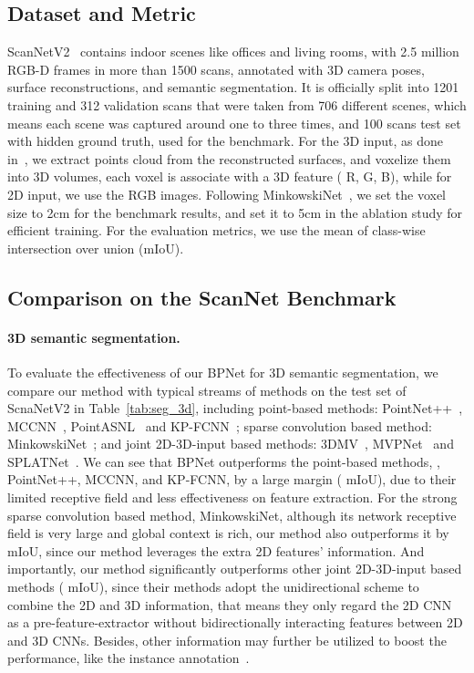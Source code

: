 \documentclass[final]{cvpr}
\begin{document}
	
\subsection{Dataset and Metric}
\vspace{-2mm}
ScanNetV2~\cite{dai2017scannet} contains indoor scenes like offices and living rooms, with 2.5 million RGB-D frames
in more than 1500 scans, annotated with 3D camera poses, surface reconstructions, and semantic segmentation.
It is officially split into 1201 training and 312 validation scans that were taken from 706 different scenes, which means each scene was captured around one to three times, and 100 scans test set with hidden ground truth, used for the benchmark.
For the 3D input, as done in~\cite{choy20194d}, we extract points cloud from the reconstructed surfaces, and voxelize them into 3D volumes, each voxel is associate with a 3D feature ( R, G, B), while for 2D input, we use the RGB images.
Following MinkowskiNet~\cite{choy20194d}, we set the voxel size to 2cm for the benchmark results, and set it to 5cm in the ablation study for efficient training.
For the evaluation metrics, we use the mean of class-wise intersection over union (mIoU).

\subsection{Comparison on the ScanNet Benchmark}
\vspace{-1mm}
\paragraph{3D semantic segmentation.}
To evaluate the effectiveness of our BPNet for 3D semantic segmentation, we compare our method with typical streams of methods on the test set of ScnaNetV2 in Table~\ref{tab:seg_3d}, including point-based methods: PointNet++~\cite{qi2017pointnet++}, MCCNN~\cite{hermosilla2018monte}, PointASNL~\cite{yan2020pointasnl} and KP-FCNN~\cite{thomas2019kpconv}; sparse convolution based method: MinkowskiNet~\cite{choy20194d}; and joint 2D-3D-input based methods: 3DMV~\cite{dai20183dmv}, MVPNet~\cite{jaritz2019multi} and SPLATNet~\cite{su2018splatnet}.
We can see that BPNet outperforms the point-based methods, \eg, PointNet++, MCCNN, and KP-FCNN, by a large margin ( mIoU), due to their limited receptive field and less effectiveness on feature extraction.
For the strong sparse convolution based method, MinkowskiNet, although its network receptive field is very large and global context is rich, our method also outperforms it by  mIoU, since our method leverages the extra 2D features' information.
And importantly, our method significantly outperforms other joint 2D-3D-input based methods ( mIoU), since their methods adopt the unidirectional scheme to combine the 2D and 3D information, that means they only regard the 2D CNN as a pre-feature-extractor without bidirectionally interacting features between 2D and 3D CNNs.
Besides, other information may further be utilized to boost the performance, like the instance annotation~\cite{han2020occuseg}.
\end{document}
